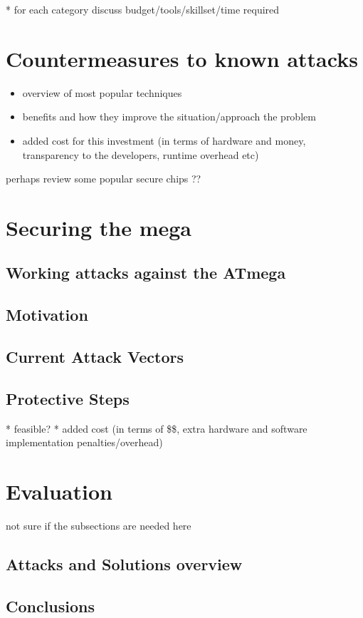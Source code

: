 \documentclass[12pt,a4paper,twocolumn]{article}
\begin{document}
	* for each category discuss budget/tools/skillset/time required\\

\section{Countermeasures to known attacks}
\label{sec:defenses}
	\begin{itemize}
	\item overview of most popular techniques \\
	\item benefits and how they improve the situation/approach the problem
	\item added cost for this investment (in terms of hardware and money, transparency to the developers, runtime overhead etc)\\
	\end{itemize}
	
	perhaps review some popular secure chips ??	
	
	

\section{Securing the mega}
\label{sec:securing_mega}
	\subsection{Working attacks against the ATmega}
	\subsection{Motivation}
	\subsection{Current Attack Vectors}
	\subsection{Protective Steps}
		* feasible? 
		* added cost (in terms of \$\$, extra hardware and software implementation penalties/overhead)
	

\section{Evaluation}
\label{sec:conclusion}
	not sure if the subsections are needed here
	\subsection{Attacks and Solutions overview}
	\subsection{Conclusions}
	
	\pagebreak
	\onecolumn
	
		
	
\end{document}
